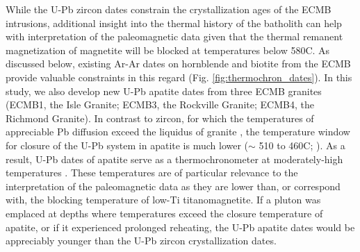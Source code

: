 \documentclass[draft]{agujournal2019}
\begin{document}
While the U-Pb zircon dates constrain the crystallization ages of the ECMB intrusions, additional insight into the thermal history of the batholith can help with interpretation of the paleomagnetic data given that the thermal remanent magnetization of magnetite will be blocked at temperatures below 580\textdegree C. As discussed below, existing Ar-Ar dates on hornblende and biotite from the ECMB provide valuable constraints in this regard (Fig. \ref{fig:thermochron_dates}). In this study, we also develop new U-Pb apatite dates from three ECMB granites (ECMB1, the Isle Granite; ECMB3, the Rockville Granite; ECMB4, the Richmond Granite). In contrast to zircon, for which the temperatures of appreciable Pb diffusion exceed the liquidus of granite \cite{Cherniak2001a}, the temperature window for closure of the U-Pb system in apatite is much lower ($\sim$ 510 to 460\textdegree C; ). As a result, U-Pb dates of apatite serve as a thermochronometer at moderately-high temperatures \cite{Chamberlain2001a, Schoene2007a, Cochrane2014a}. These temperatures are of particular relevance to the interpretation of the paleomagnetic data as they are lower than, or correspond with, the blocking temperature of low-Ti titanomagnetite. If a pluton was emplaced at depths where temperatures exceed the closure temperature of apatite, or if it experienced prolonged reheating, the U-Pb apatite dates would be appreciably younger than the U-Pb zircon crystallization dates.
\end{document}
